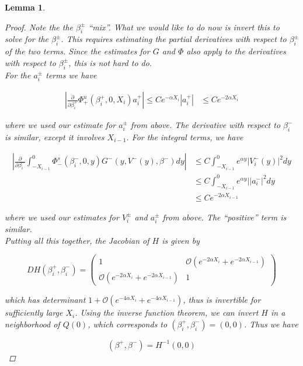 \documentclass[12pt]{article}
\newtheorem{lemma}{Lemma}
\begin{document}
\begin{lemma}
\begin{proof}
Note the the $\beta_i^\pm$ ``mix''. What we would like to do now is invert this to solve for the $\beta_i^\pm$. This requires estimating the partial derivatives with respect to $\beta_i^\pm$ of the two terms. Since the estimates for $G$ and $\Phi$ also apply to the derivatives with respect to $\beta_i^\pm$, this is not hard to do.\\

For the $a_i^\pm$ terms we have

\begin{align*}
\left| \frac{\partial}{\partial \beta_i^+} \Phi^u_+(\beta_i^+, 0, X_i) a_i^+ \right| \leq C e^{-\alpha X_i}|a_i^+|
& \leq C e^{-2 \alpha X_i}
\end{align*}

where we used our estimate for $a_i^\pm$ from above. The derivative with respect to $\beta_i^-$ is similar, except it involves $X_{i-1}$. For the integral terms, we have

\begin{align*}
\left| \frac{\partial}{\partial \beta_i^-} \int_{-X_{i-1}}^0 \Phi_-^s(\beta_i^-, 0, y) G^-(y, V^-(y),\beta^-)dy \right| 
&\leq C \int_{-X_{i-1}}^0 e^{\alpha y} | V_i^-(y) |^2 dy \\
&\leq C \int_{-X_{i-1}}^0 e^{\alpha y} | |a_i^-|^2 dy \\
&\leq C e^{-2 \alpha X_{i-1}}
\end{align*}

where we used our estimates for $V_i^\pm$ and $a_i^\pm$ from above. The ``positive'' term is similar. \\

Putting all this together, the Jacobian of $H$ is given by

\begin{equation}
D H(\beta_i^+, \beta_i^-) = 
\begin{pmatrix}
1 & \mathcal{O}(e^{-2 \alpha X_i} + e^{-2 \alpha X_{i-1}} ) \\
\mathcal{O}(e^{-2 \alpha X_i} + e^{-2 \alpha X_{i-1}} ) &  1 
\end{pmatrix}
\end{equation}

which has determinant $1 + \mathcal{O}(e^{-4 \alpha X_i} + e^{-4 \alpha X_{i-1}})$, thus is invertible for sufficiently large $X_i$. Using the inverse function theorem, we can invert $H$ in a neighborhood of $Q(0)$, which corresponds to $(\beta_i^+, \beta_i^-) = (0, 0)$. Thus we have 

\[
(\beta^+, \beta^-) = H^{-1}(0, 0)
\]


\end{proof}
\end{lemma}
\end{document}
